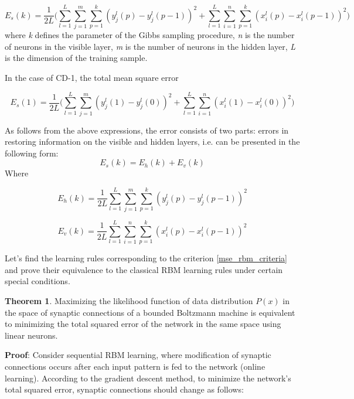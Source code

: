 \begin{equation*}
     E_s(k)=\frac{1}{2L}\Bigg(\sum_{l=1}^L\sum_{j=1}^m\sum_{p=1}^k (y_j^l(p)-y_j^l(p-1))^2+\sum_{l=1}^L\sum_{i=1}^n\sum_{p=1}^k (x_i^l(p)-x_i^l(p -1))^2\Bigg)
\end{equation*}
where \textit{k} defines the parameter of the Gibbs sampling procedure, \textit{n} is the number of neurons in the visible layer, \textit{m} is the number of neurons in the hidden layer, \textit{L} is the dimension of the training sample.

In the case of CD-1, the total mean square error

\begin{equation}
     E_s(1)=\frac{1}{2L}\Bigg(\sum_{l=1}^L\sum_{j=1}^m (y_j^l(1)-y_j^l(0))^2+\sum_{l=1}^L\sum_{i=1}^n (x_i^l(1)-x_i^l(0))^2\Bigg)
\end{equation}

As follows from the above expressions, the error consists of two parts: errors in restoring information on the visible and hidden layers, i.e. can be presented in the following form:
\begin{equation}
\label{mse_rbm_criteria}
E_s(k) = E_h(k) + E_v(k)
\end{equation}
Where

\begin{equation}
E_h(k) = \frac{1}{2L}\sum_{l=1}^L\sum_{j=1}^m\sum_{p=1}^k (y_j^l(p)-y_j^l(p-1))^2
\end{equation}

\begin{equation}
E_v(k) = \frac{1}{2L}\sum_{l=1}^L\sum_{i=1}^n\sum_{p=1}^k (x_i^l(p)-x_i^l(p-1))^2
\end{equation}

Let's find the learning rules corresponding to the criterion \ref{mse_rbm_criteria} and prove their equivalence to the classical RBM learning rules under certain special conditions.

\textbf{Theorem 1}. Maximizing the likelihood function of data distribution $P(x)$ in the space of synaptic connections of a bounded Boltzmann machine is equivalent to minimizing the total squared error of the network in the same space using linear neurons.

\textbf{Proof}: Consider sequential RBM learning, where modification of synaptic connections occurs after each input pattern is fed to the network (online learning). According to the gradient descent method, to minimize the network's total squared error, synaptic connections should change as follows:

